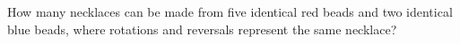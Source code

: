 How many necklaces can be made from five identical red beads and two identical blue beads, where rotations and reversals represent the same necklace?

